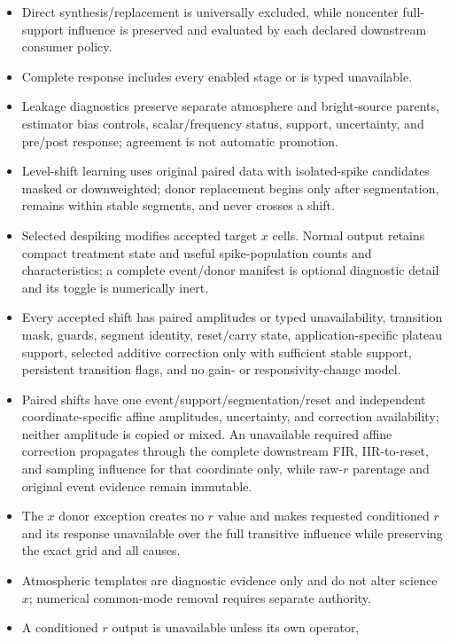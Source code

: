 \documentclass[10pt]{article}
\begin{document}
\begin{itemize}
      availability cases, with no dependency on legacy responsivity.
\item Direct synthesis/replacement is universally excluded, while noncenter
      full-support influence is preserved and evaluated by each declared
      downstream consumer policy.
\item Complete response includes every enabled stage or is typed unavailable.
\item Leakage diagnostics preserve separate atmosphere and bright-source
      parents, estimator bias controls, scalar/frequency status, support,
      uncertainty, and pre/post response; agreement is not automatic promotion.
\item Level-shift learning uses original paired data with isolated-spike
      candidates masked or downweighted; donor replacement begins only after
      segmentation, remains within stable segments, and never crosses a shift.
\item Selected despiking modifies accepted target $x$ cells.  Normal output
      retains compact treatment state and useful spike-population counts and
      characteristics; a complete event/donor manifest is optional diagnostic
      detail and its toggle is numerically inert.
\item Every accepted shift has paired amplitudes or typed unavailability,
      transition mask, guards, segment identity, reset/carry state,
      application-specific plateau support, selected additive correction only
      with sufficient stable support, persistent transition flags, and no
      gain- or responsivity-change model.
\item Paired shifts have one event/support/segmentation/reset and independent
      coordinate-specific affine amplitudes, uncertainty, and correction
      availability; neither amplitude is copied or mixed.  An unavailable
      required affine correction propagates through the complete downstream
      FIR, IIR-to-reset, and sampling influence for that coordinate only, while
      raw-$r$ parentage and original event evidence remain immutable.
\item The $x$ donor exception creates no $r$ value and makes requested
      conditioned $r$ and its response unavailable over the full transitive
      influence while preserving the exact grid and all causes.
\item Atmospheric templates are diagnostic evidence only and do not alter
      science $x$; numerical common-mode removal requires separate authority.
\item A conditioned $r$ output is unavailable unless its own operator,

\end{itemize}
\end{document}
